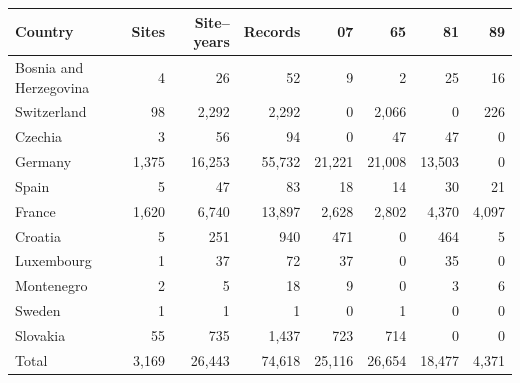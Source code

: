 \begin{tabular}{lrrrrrrr}
\toprule
Country & Sites & Site--years & Records & 07 & 65 & 81 & 89 \\
\midrule
Bosnia and Herzegovina & 4 & 26 & 52 & 9 & 2 & 25 & 16 \\
Switzerland & 98 & 2,292 & 2,292 & 0 & 2,066 & 0 & 226 \\
Czechia & 3 & 56 & 94 & 0 & 47 & 47 & 0 \\
Germany & 1,375 & 16,253 & 55,732 & 21,221 & 21,008 & 13,503 & 0 \\
Spain & 5 & 47 & 83 & 18 & 14 & 30 & 21 \\
France & 1,620 & 6,740 & 13,897 & 2,628 & 2,802 & 4,370 & 4,097 \\
Croatia & 5 & 251 & 940 & 471 & 0 & 464 & 5 \\
Luxembourg & 1 & 37 & 72 & 37 & 0 & 35 & 0 \\
Montenegro & 2 & 5 & 18 & 9 & 0 & 3 & 6 \\
Sweden & 1 & 1 & 1 & 0 & 1 & 0 & 0 \\
Slovakia & 55 & 735 & 1,437 & 723 & 714 & 0 & 0 \\
\midrule
Total & 3,169 & 26,443 & 74,618 & 25,116 & 26,654 & 18,477 & 4,371 \\
\bottomrule
\end{tabular}
